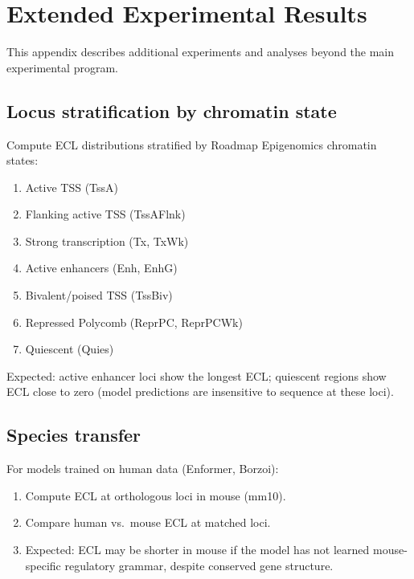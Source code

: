 \section{Extended Experimental Results}\label{app:extraexp}

This appendix describes additional experiments and analyses beyond the main experimental program.

\subsection{Locus stratification by chromatin state}

Compute ECL distributions stratified by Roadmap Epigenomics chromatin states:
\begin{enumerate}[leftmargin=2em, label=(\roman*)]
\item Active TSS (TssA)
\item Flanking active TSS (TssAFlnk)
\item Strong transcription (Tx, TxWk)
\item Active enhancers (Enh, EnhG)
\item Bivalent/poised TSS (TssBiv)
\item Repressed Polycomb (ReprPC, ReprPCWk)
\item Quiescent (Quies)
\end{enumerate}

Expected: active enhancer loci show the longest ECL; quiescent regions show ECL close to zero (model predictions are insensitive to sequence at these loci).

\subsection{Species transfer}

For models trained on human data (Enformer, Borzoi):
\begin{enumerate}[leftmargin=2em, label=(\roman*)]
\item Compute ECL at orthologous loci in mouse (mm10).
\item Compare human vs.\ mouse ECL at matched loci.
\item Expected: ECL may be shorter in mouse if the model has not learned mouse-specific regulatory grammar, despite conserved gene structure.
\end{enumerate}


